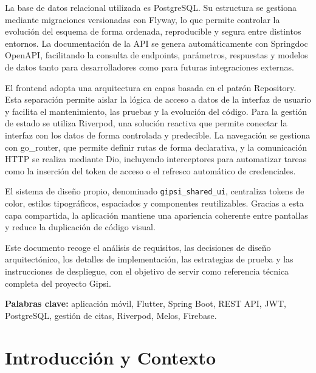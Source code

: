 \documentclass[12pt,a4paper,twoside]{report}
\begin{document}
La base de datos relacional utilizada es PostgreSQL. Su estructura se gestiona mediante
migraciones versionadas con Flyway, lo que permite controlar la evolución del esquema
de forma ordenada, reproducible y segura entre distintos entornos. La documentación
de la API se genera automáticamente con Springdoc OpenAPI, facilitando la consulta
de endpoints, parámetros, respuestas y modelos de datos tanto para desarrolladores
como para futuras integraciones externas.

El frontend adopta una arquitectura en capas basada en el patrón Repository. Esta
separación permite aislar la lógica de acceso a datos de la interfaz de usuario y facilita
el mantenimiento, las pruebas y la evolución del código. Para la gestión de estado se
utiliza Riverpod, una solución reactiva que permite conectar la interfaz con los datos
de forma controlada y predecible. La navegación se gestiona con go\_router, que permite
definir rutas de forma declarativa, y la comunicación HTTP se realiza mediante Dio,
incluyendo interceptores para automatizar tareas como la inserción del token de acceso
o el refresco automático de credenciales.

El sistema de diseño propio, denominado \texttt{gipsi\_shared\_ui}, centraliza tokens de
color, estilos tipográficos, espaciados y componentes reutilizables. Gracias a esta capa
compartida, la aplicación mantiene una apariencia coherente entre pantallas y reduce
la duplicación de código visual.

Este documento recoge el análisis de requisitos, las decisiones de diseño arquitectónico,
los detalles de implementación, las estrategias de prueba y las instrucciones de despliegue,
con el objetivo de servir como referencia técnica completa del proyecto Gipsi.

\vspace{1em}
\noindent\textbf{Palabras clave:} aplicación móvil, Flutter, Spring Boot, REST API, JWT, PostgreSQL, gestión de citas, Riverpod, Melos, Firebase.
\newpage

\tableofcontents
\listoffigures
\listoftables
\lstlistoflistings

\cleardoublepage

\chapter{Introducción y Contexto}
\end{document}
